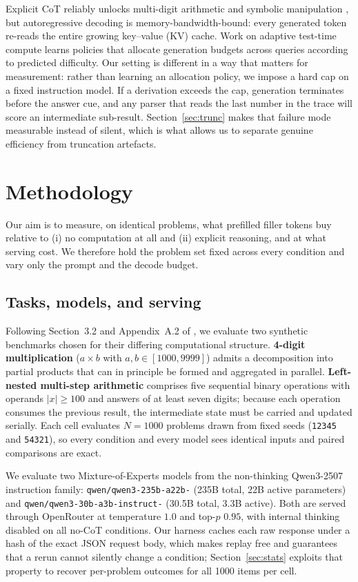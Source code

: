 \documentclass[11pt,a4paper]{article}
\begin{document}
Explicit CoT reliably unlocks multi-digit arithmetic and symbolic manipulation
\citep{wei2022cot}, but autoregressive decoding is memory-bandwidth-bound: every
generated token re-reads the entire growing key--value (KV) cache. Work on
adaptive test-time compute \citep{damani2025learning} learns policies that
allocate generation budgets across queries according to predicted difficulty.
Our setting is different in a way that matters for measurement: rather than
learning an allocation policy, we impose a hard cap on a fixed instruction model.
If a derivation exceeds the cap, generation terminates before the answer cue, and
any parser that reads the last number in the trace will score an intermediate
sub-result. Section~\ref{sec:trunc} makes that failure mode measurable instead of
silent, which is what allows us to separate genuine efficiency from truncation
artefacts.

\section{Methodology}
\label{sec:method}

Our aim is to measure, on identical problems, what prefilled filler tokens buy
relative to (i) no computation at all and (ii) explicit reasoning, and at what
serving cost. We therefore hold the problem set fixed across every condition and
vary only the prompt and the decode budget.

\subsection{Tasks, models, and serving}

Following Section~3.2 and Appendix~A.2 of \citet{baherwani2026not}, we evaluate
two synthetic benchmarks chosen for their differing computational structure.
\textbf{4-digit multiplication} ($a\times b$ with $a,b\in[1000,9999]$) admits a
decomposition into partial products that can in principle be formed and
aggregated in parallel. \textbf{Left-nested multi-step arithmetic} comprises five
sequential binary operations with operands $|x|\geq100$ and answers of at least
seven digits; because each operation consumes the previous result, the
intermediate state must be carried and updated serially. Each cell evaluates
$N{=}1000$ problems drawn from fixed seeds (\texttt{12345} and \texttt{54321}),
so every condition and every model sees identical inputs and paired comparisons
are exact.

We evaluate two Mixture-of-Experts models from the non-thinking Qwen3-2507
instruction family: \texttt{qwen/qwen3-\allowbreak235b-\allowbreak a22b-} (235B total, 22B active
parameters) and \texttt{qwen/qwen3-\allowbreak30b-\allowbreak a3b-\allowbreak instruct-} (30.5B total, 3.3B
active). Both are served through OpenRouter \citep{openrouter2026} at temperature
$1.0$ and top-$p$ $0.95$, with internal thinking disabled on all no-CoT
conditions. Our harness caches each raw response under a hash of the exact JSON
request body, which makes replay free and guarantees that a rerun cannot silently
change a condition; Section~\ref{sec:stats} exploits that property to recover
per-problem outcomes for all 1000 items per cell.
\end{document}
